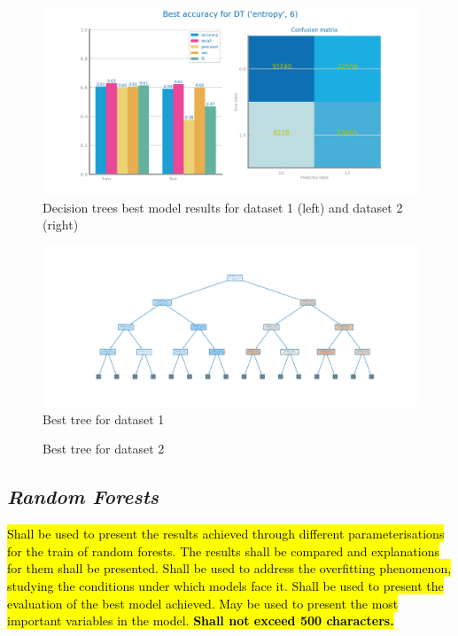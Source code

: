\documentclass[10pt]{extarticle}
\newcommand{\ctext}[3][RGB]{%
  \begingroup
  \definecolor{hlcolor}{#1}{#2}\sethlcolor{hlcolor}%
  \hl{#3}%
  \endgroup
}
\begin{document}
\begin{figure}[H]
\centering\includegraphics[scale=0.95]{images/dataset1/models_evaluation/CovidPos_dt_DT_best_accuracy_eval.png}
\caption{Decision trees best model results for dataset 1 (left) and dataset 2 (right)}
\end{figure}

\begin{figure}[H]
\centering\includegraphics[scale=0.70]{images/dataset1/models_evaluation/CovidPos_dt_accuracy_best_tree.png}
\caption{Best tree for dataset 1}
\end{figure}

\begin{figure}[H]
\caption{Best tree for dataset 2}
\end{figure}

\subsection*{\textit{Random Forests}}
\ctext[RGB]{190,190,190}{Shall be used to present the results achieved through different parameterisations for the train of random forests. The results shall be compared and explanations for them shall be presented. Shall be used to address the overfitting phenomenon, studying the conditions under which models face it. Shall be used to present the evaluation of the best model achieved. May be used to present the most important variables in the model.  \textbf{Shall not exceed 500 characters.}}
\end{document}
